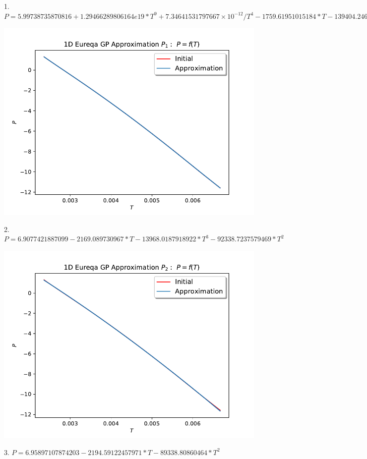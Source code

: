 \documentclass[english,12pt,a4paper]{article}
\theoremstyle{definition}
\begin{document}
1. $P=5.99738735870816+1.29466289806164e19*T^{9}+7.34641531797667\times10^{-12}/T^{4}-1759.61951015184*T-139404.24651719*T^{2}$

\includegraphics[scale=0.7]{Test1DEqP1}

\vspace{0.5cm}

2. $P=6.9077421887099-2169.089730967*T-13968.0187918922*T^{3}-92338.7237579469*T^{2}$

\includegraphics[scale=0.7]{Test1DEqP2}

\newpage{}

3. $P=6.95897107874203-2194.59122457971*T-89338.80860464*T^{2}$
\end{document}
